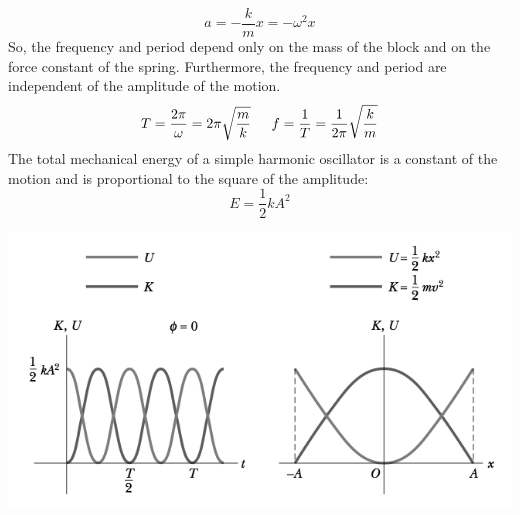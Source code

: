 \documentclass{article}
\begin{document}
        \[
        	a=-\frac{k}{m}x=-\omega^2x
        \]
        So, the frequency and period depend only on the mass of the block and on the force constant of the spring. Furthermore, the frequency and period are independent of the amplitude of the motion.
        \[
        	T=\frac{2\pi}{\omega}=2\pi\sqrt{\frac{m}{k}} \indent
            f=\frac{1}{T}=\frac{1}{2\pi}\sqrt{\frac{k}{m}}
        \]
        The total mechanical energy of a simple harmonic oscillator is a constant of the motion and is proportional to the square of the amplitude:
        \[
        	E=\frac{1}{2}kA^2
        \]
        \centerline{\includegraphics[width=14cm]{energyGr.png}}
        
\end{document}
